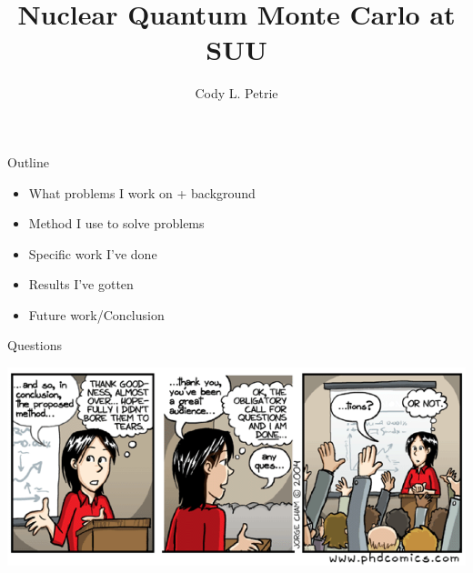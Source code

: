\documentclass{beamer}
\title[Nuclear QMC]{Nuclear Quantum Monte Carlo at SUU}
\author[Cody L. Petrie, cody.petrie@asu.edu]{Cody L. Petrie}
\institute{Southern Utah University \\ Cedar City, UT}
\date{}
\begin{document}
\begin{frame}
   \titlepage
\end{frame}

\begin{frame}{Outline}
\begin{itemize}
   \item What problems I work on + background
   \item Method I use to solve problems
   \item Specific work I've done
   \item Results I've gotten
   \item Future work/Conclusion
\end{itemize}
\end{frame}

\begin{frame}{Questions}
\begin{center}
   \includegraphics[width=1.0\textwidth]{figures/questions_comic.png}
\end{center}
\end{frame}
\end{document}
